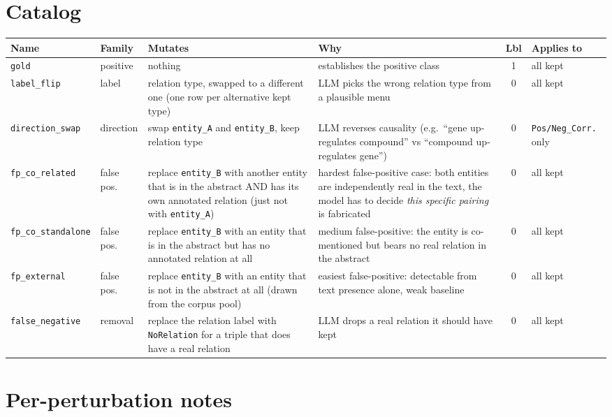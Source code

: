 \documentclass[11pt,a4paper]{article}
\newcommand{\code}[1]{\texttt{#1}}
\begin{document}
\section*{Catalog}

\renewcommand{\arraystretch}{1.25}
\begin{tabularx}{\textwidth}{@{}l l X X c l@{}}
\toprule
\textbf{Name} & \textbf{Family} & \textbf{Mutates} & \textbf{Why} & \textbf{Lbl} & \textbf{Applies to} \\
\midrule
\code{gold} & positive & nothing & establishes the positive class & 1 & all kept \\
\code{label\_flip} & label & relation type, swapped to a different one (one row per alternative kept type) & LLM picks the wrong relation type from a plausible menu & 0 & all kept \\
\code{direction\_swap} & direction & swap \code{entity\_A} and \code{entity\_B}, keep relation type & LLM reverses causality (e.g.\ ``gene up-regulates compound'' vs ``compound up-regulates gene'') & 0 & \code{Pos/Neg\_Corr.} only \\
\code{fp\_co\_related} & false pos. & replace \code{entity\_B} with another entity that is in the abstract AND has its own annotated relation (just not with \code{entity\_A}) & hardest false-positive case: both entities are independently real in the text, the model has to decide \emph{this specific pairing} is fabricated & 0 & all kept \\
\code{fp\_co\_standalone} & false pos. & replace \code{entity\_B} with an entity that is in the abstract but has no annotated relation at all & medium false-positive: the entity is co-mentioned but bears no real relation in the abstract & 0 & all kept \\
\code{fp\_external} & false pos. & replace \code{entity\_B} with an entity that is not in the abstract at all (drawn from the corpus pool) & easiest false-positive: detectable from text presence alone, weak baseline & 0 & all kept \\
\code{false\_negative} & removal & replace the relation label with \code{NoRelation} for a triple that does have a real relation & LLM drops a real relation it should have kept & 0 & all kept \\
\bottomrule
\end{tabularx}

\section*{Per-perturbation notes}
\end{document}
